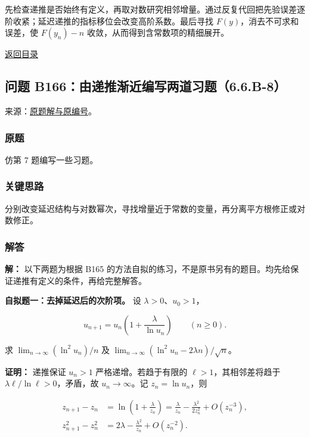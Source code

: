 \documentclass[11pt,a4paper]{article}
\begin{document}
先检查递推是否始终有定义，再取对数研究相邻增量。通过反复代回把先验误差逐阶收紧；延迟递推的指标移位会改变高阶系数。最后寻找
\(F(y)\)，消去不可求和误差，使 \(F(y_n)-n\)
收敛，从而得到含常数项的精细展开。

\noindent\hyperref[contents]{返回目录}

\subsection{问题
B166：由递推渐近编写两道习题（6.6.B-8）}\label{ux95eeux9898-b166ux7531ux9012ux63a8ux6e10ux8fd1ux7f16ux5199ux4e24ux9053ux4e60ux98986.6.b-8}

来源：\href{https://zj139.github.io/math-notes/problems/a0a262f9a6114b75980fa4f7/\#问题-b166}{原题解与原编号}。

\subsubsection{原题}\label{ux539fux9898-10}

仿第 7 题编写一些习题。

\subsubsection{关键思路}\label{ux5173ux952eux601dux8def-10}

分别改变延迟结构与对数幂次，寻找增量近于常数的变量，再分离平方根修正或对数修正。

\subsubsection{解答}\label{ux89e3ux7b54-10}

\textbf{解：} 以下两题为根据 B165
的方法自拟的练习，不是原书另有的题目。均先给保证递推有定义的条件，再给完整解答。

\textbf{自拟题一：去掉延迟后的次阶项。} 设 \(\lambda>0\)、\(u_0>1\)，

\[
u_{n+1}=u_n\left(1+\frac{\lambda}{\ln u_n}\right)\qquad(n\ge0).
\]

求 \(\lim_{n\to\infty}(\ln^2u_n)/n\) 及
\(\lim_{n\to\infty}(\ln^2u_n-2\lambda n)/\sqrt n\)。

\textbf{证明：} 递推保证 \(u_n>1\) 严格递增。若趋于有限的
\(\ell>1\)，其相邻差将趋于 \(\lambda\ell/\ln\ell>0\)，矛盾，故
\(u_n\to\infty\)。记 \(z_n=\ln u_n\)，则

\[
\begin{aligned}
z_{n+1}-z_n
&=\ln\left(1+\frac\lambda{z_n}\right)
=\frac\lambda{z_n}-\frac{\lambda^2}{2z_n^2}+O(z_n^{-3}),\\
z_{n+1}^2-z_n^2
&=2\lambda-\frac{\lambda^2}{z_n}+O(z_n^{-2}).
\end{aligned}
\]
\end{document}
